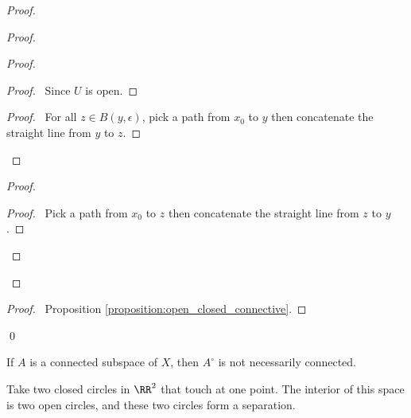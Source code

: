 \begin{proof}
    \pf
    \begin{proof}
        \begin{proof}
            \begin{proof}
                \pf\ Since $U$ is open.
            \end{proof}
            \begin{proof}
                \pf\ For all $z \in B(y, \epsilon)$, pick a path from $x_0$ to $y$ then concatenate the straight line from $y$ to $z$.
            \end{proof}
        \end{proof}
        \begin{proof}
            \begin{proof}
                \pf\ Pick a path from $x_0$ to $z$ then concatenate the straight line from $z$ to $y$.
            \end{proof}
        \end{proof}
    \end{proof}
    \begin{proof}
        \pf\ Proposition \ref{proposition:open_closed_connective}.
    \end{proof}
    \qed
\end{proof}

\begin{example}
    If $A$ is a connected subspace of $X$, then $A^\circ$ is not necessarily connected.

    Take two closed circles in $\RR^2$ that touch at one point. The interior of this space is
    two open circles, and these two circles form a separation.
\end{example}

